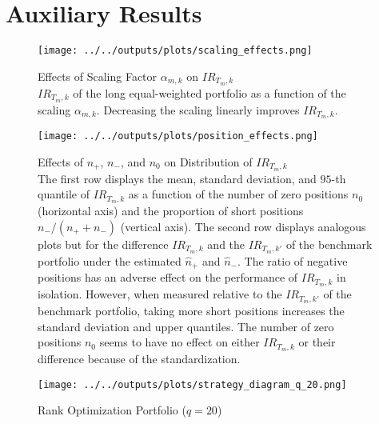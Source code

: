 \documentclass[3p,times,twocolumn]{elsarticle}
\begin{document}
\section{Auxiliary Results}\label{appendix:auxiliary_results}

\begin{figure}[!htbp]
    \centering
    \texttt{[image: ../../outputs/plots/scaling\_effects.png]}
    \caption{Effects of Scaling Factor $\alpha_{m,k}$ on $IR_{T_{m},k}$\\
        \footnotesize
        $IR_{T_{m},k}$ of the long equal-weighted portfolio as a function of the scaling $\alpha_{m,k}$.
        Decreasing the scaling linearly improves $IR_{T_{m},k}$.
    }
    \label{fig:scaling_effects}
\end{figure}

\begin{figure}[!htbp]
    \centering
    \texttt{[image: ../../outputs/plots/position\_effects.png]}
    \caption{Effects of $n_{+}$, $n_{-}$, and $n_{0}$ on Distribution of $IR_{T_{m},k}$\\
    \footnotesize
    The first row displays the mean, standard deviation, and $95$-th quantile of $IR_{T_{m},k}$ as a function of the number of zero positions $n_{0}$ (horizontal axis) and the proportion of short positions $n_{-}/(n_{+}+n_{-})$ (vertical axis).
    The second row displays analogous plots but for the difference $IR_{T_{m},k}$ and the $IR_{T_{m},k'}$ of the benchmark portfolio under the estimated $\hat{n}_{+}$ and $\hat{n}_{-}$.
    The ratio of negative positions has an adverse effect on the performance of $IR_{T_{m},k}$ in isolation.
    However, when measured relative to the $IR_{T_{m},k'}$ of the benchmark portfolio, taking more short positions increases the standard deviation and upper quantiles.
    The number of zero positions $n_{0}$ seems to have no effect on either $IR_{T_{m},k}$ or their difference because of the standardization.
    }
    \label{fig:position_effects}
\end{figure}

\begin{figure}[!htbp]
    \centering
    \texttt{[image: ../../outputs/plots/strategy\_diagram\_q\_20.png]}
    \caption{Rank Optimization Portfolio ($q=20$)\\
        \footnotesize
    }
    \label{fig:strategy_diagram_q_20}
\end{figure}


\end{document}
